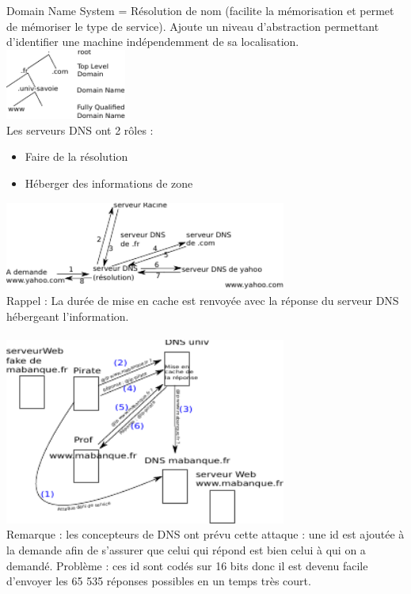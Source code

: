  Domain Name System = Résolution de nom (facilite la mémorisation et permet de mémoriser le type de service). Ajoute un niveau d'abstraction permettant d'identifier une machine indépendemment de sa localisation.\\

\includegraphics[width=150px]{Images/11_DNSnommage.pdf} \\

Les serveurs DNS ont 2 rôles :
\begin{itemize}
	\item Faire de la résolution
	\item Héberger des informations de zone
\end{itemize}

\includegraphics[width=350px]{Images/12_DNSresolution.pdf} \\

Rappel : La durée de mise en cache est renvoyée avec la réponse du serveur DNS hébergeant l'information. \\

 \\
\includegraphics[width=350px]{Images/13_DNSspoofing.pdf} \\
Remarque : les concepteurs de DNS ont prévu cette attaque : une id est ajoutée à la demande afin de s'assurer que celui qui répond est bien celui à qui on a demandé. Problème : ces id sont codés sur 16 bits donc il est devenu facile d'envoyer les 65 535 réponses possibles en un temps très court.\\

